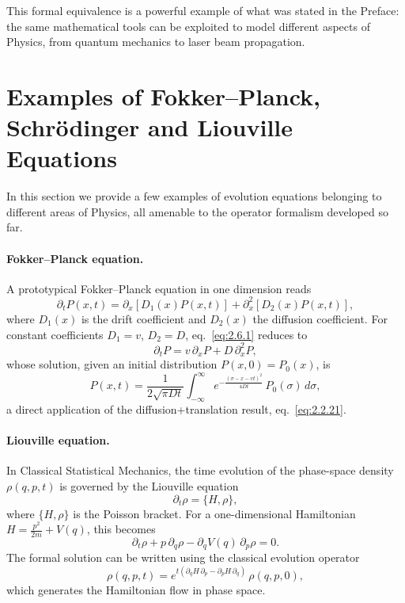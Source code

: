 This formal equivalence is a powerful example of what was stated in the Preface: the same mathematical tools can be exploited to model different aspects of Physics, from quantum mechanics to laser beam propagation.

\section{Examples of Fokker--Planck, Schr\"odinger and Liouville Equations}

In this section we provide a few examples of evolution equations belonging to different areas of Physics, all amenable to the operator formalism developed so far.

\paragraph{Fokker--Planck equation.}
A prototypical Fokker--Planck equation in one dimension reads
\begin{equation}
\partial_{t}P(x,t)=\partial_{x}\!\left[D_{1}(x)P(x,t)\right]
+\partial_{x}^{2}\!\left[D_{2}(x)P(x,t)\right],
\label{eq:2.6.1}
\end{equation}
where $D_{1}(x)$ is the drift coefficient and $D_{2}(x)$ the diffusion coefficient. For constant coefficients $D_{1}=v$, $D_{2}=D$, eq.~\eqref{eq:2.6.1} reduces to
\begin{equation}
\partial_{t}P=v\,\partial_{x}P+D\,\partial_{x}^{2}P,
\label{eq:2.6.2}
\end{equation}
whose solution, given an initial distribution $P(x,0)=P_{0}(x)$, is
\begin{equation}
P(x,t)=\frac{1}{2\sqrt{\pi D t}}
\int_{-\infty}^{\infty}
e^{-\frac{(\sigma-x-vt)^{2}}{4Dt}}\,P_{0}(\sigma)\,d\sigma,
\label{eq:2.6.3}
\end{equation}
a direct application of the diffusion+translation result, eq.~\eqref{eq:2.2.21}.

\paragraph{Liouville equation.}
In Classical Statistical Mechanics, the time evolution of the phase-space density $\rho(q,p,t)$ is governed by the Liouville equation
\begin{equation}
\partial_{t}\rho=\{H,\rho\},
\label{eq:2.6.4}
\end{equation}
where $\{H,\rho\}$ is the Poisson bracket. For a one-dimensional Hamiltonian $H=\frac{p^{2}}{2m}+V(q)$, this becomes
\begin{equation}
\partial_{t}\rho+p\,\partial_{q}\rho-\partial_{q}V(q)\,\partial_{p}\rho=0.
\label{eq:2.6.5}
\end{equation}
The formal solution can be written using the classical evolution operator
\begin{equation}
\rho(q,p,t)=e^{t(\partial_{q}H\,\partial_{p}-\partial_{p}H\,\partial_{q})}\,\rho(q,p,0),
\label{eq:2.6.6}
\end{equation}
which generates the Hamiltonian flow in phase space.

